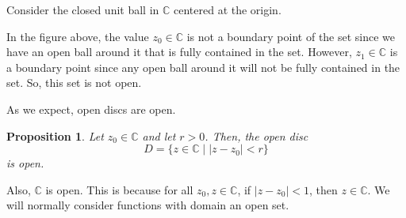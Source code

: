 \documentclass[a4paper, openany]{memoir}
\theoremstyle{definition}
\theoremstyle{plain}
\newtheorem{proposition}[definition]{Proposition}
\begin{document}
Consider the closed unit ball in $\mathbb{C}$ centered at the origin.
\begin{figure}[H]
    \centering
\end{figure}
\noindent In the figure above, the value $z_0 \in \mathbb{C}$ is not a boundary point of the set since we have an open ball around it that is fully contained in the set. However, $z_1 \in \mathbb{C}$ is a boundary point since any open ball around it will not be fully contained in the set. So, this set is not open.

As we expect, open discs are open.
\begin{proposition}
Let $z_0 \in \mathbb{C}$ and let $r > 0$. Then, the open disc
\[D = \{z \in \mathbb{C} \mid |z - z_0| < r\}\]
is open.
\end{proposition}
\noindent Also, $\mathbb{C}$ is open. This is because for all $z_0, z \in \mathbb{C}$, if $|z - z_0| < 1$, then $z \in \mathbb{C}$. We will normally consider functions with domain an open set.
\end{document}
